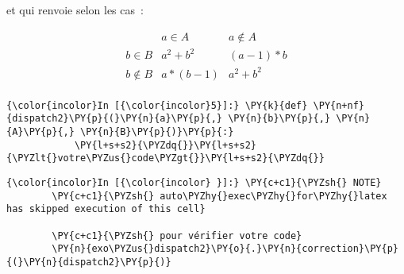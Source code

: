 et qui renvoie selon les cas~:

\[
\begin{array}{c|c|c}
\ & a \in A & a\notin A \\
\hline
b\in B & a^2+b^2 & (a-1)*b\\
\hline
b\notin B & a*(b-1)& a^2+b^2\\
\end{array}
\]

    \begin{Verbatim}[commandchars=\\\{\}]
{\color{incolor}In [{\color{incolor}5}]:} \PY{k}{def} \PY{n+nf}{dispatch2}\PY{p}{(}\PY{n}{a}\PY{p}{,} \PY{n}{b}\PY{p}{,} \PY{n}{A}\PY{p}{,} \PY{n}{B}\PY{p}{)}\PY{p}{:}
            \PY{l+s+s2}{\PYZdq{}}\PY{l+s+s2}{\PYZlt{}votre\PYZus{}code\PYZgt{}}\PY{l+s+s2}{\PYZdq{}}
\end{Verbatim}


    \begin{Verbatim}[commandchars=\\\{\}]
{\color{incolor}In [{\color{incolor} }]:} \PY{c+c1}{\PYZsh{} NOTE}
        \PY{c+c1}{\PYZsh{} auto\PYZhy{}exec\PYZhy{}for\PYZhy{}latex has skipped execution of this cell}
        
        \PY{c+c1}{\PYZsh{} pour vérifier votre code}
        \PY{n}{exo\PYZus{}dispatch2}\PY{o}{.}\PY{n}{correction}\PY{p}{(}\PY{n}{dispatch2}\PY{p}{)}
\end{Verbatim}



    
    
    
